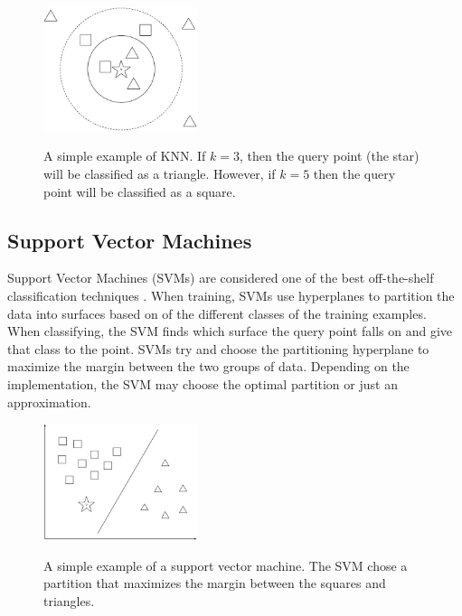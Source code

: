 \documentclass[12pt]{ucthesis}
\newcommand{\captionfonts}{\small\bf\ssp}
\begin{document}
\begin{figure}
   \begin{center}
      \includegraphics[width=0.4\textwidth]{images/KNN.eps}
      \captionfonts
      \caption[K-Nearest Neighbors]{A simple example of KNN. If $k = 3$, then the query point (the star) will be classified as a triangle. However, if $k = 5$ then the query point will be classified as a square.}
      \label{fig:knn}
   \end{center}
\end{figure}

\subsection{Support Vector Machines}
\label{background-classifiers-svm}
Support Vector Machines (SVMs) are considered one of the best off-the-shelf classification techniques \cite{Vapnik}.
When training, SVMs use hyperplanes to partition the data into surfaces based on of the different classes of the training examples.
When classifying, the SVM finds which surface the query point falls on and give that class to the point.
SVMs try and choose the partitioning hyperplane to maximize the margin between the two groups of data.
Depending on the implementation, the SVM may choose the optimal partition or just an approximation.

\begin{figure}
   \begin{center}
      \includegraphics[width=0.4\textwidth]{images/SVM.eps}
      \captionfonts
      \caption[Support Vector Machine]{A simple example of a support vector machine. The SVM chose a partition that maximizes the margin between the squares and triangles.}
      \label{fig:svm}
   \end{center}
\end{figure}
\end{document}
